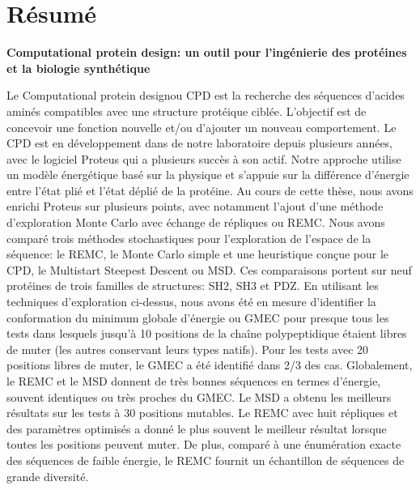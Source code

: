 

\section*{Résumé}

{\large\bf\noindent Computational protein design: un outil pour l’ingénierie des protéines et la biologie synthétique}

\bigskip

Le \og Computational protein design\fg ou CPD est la recherche des séquences d’acides aminés compatibles avec une structure protéique ciblée. L’objectif est de concevoir une fonction nouvelle et/ou d’ajouter un nouveau comportement. Le CPD est en développement dans de notre laboratoire depuis plusieurs années, avec le logiciel Proteus qui a plusieurs succès à son actif. Notre approche utilise un modèle énergétique basé sur la physique et s'appuie sur la différence d'énergie entre l'état plié et l'état déplié de la protéine.
Au cours de cette thèse, nous avons enrichi Proteus sur plusieurs points, avec notamment l’ajout d’une méthode d’exploration Monte Carlo avec échange de répliques ou REMC. Nous avons comparé trois méthodes stochastiques pour l'exploration de l'espace de la séquence: le REMC, le Monte Carlo simple et une heuristique conçue pour le CPD, le \og Multistart Steepest Descent \fg ou MSD. Ces comparaisons portent sur neuf protéines de trois familles de structures: SH2, SH3 et PDZ. En utilisant les techniques d'exploration ci-dessus, nous avons été en mesure d'identifier la conformation du minimum globale d'énergie ou GMEC pour presque tous les tests dans lesquels jusqu'à 10 positions de la chaîne polypeptidique étaient libres de muter (les autres conservant leurs types natifs). Pour les tests avec 20 positions libres de muter, le GMEC a été identifié dans 2/3 des cas. Globalement, le REMC et le MSD donnent de très bonnes séquences en termes d’énergie, souvent identiques ou très proches du GMEC. Le MSD a obtenu les meilleurs résultats sur les tests à 30 positions mutables. Le REMC avec huit répliques et des paramètres optimisés a donné le plus souvent le meilleur résultat lorsque toutes les positions peuvent muter. De plus, comparé à une énumération exacte des séquences de faible énergie, le REMC fournit un échantillon de séquences de grande diversité.

